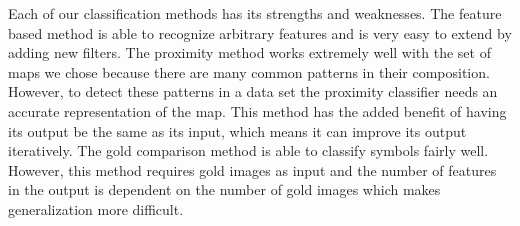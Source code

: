 
Each of our classification methods has its strengths and weaknesses.  The
feature based method is able to recognize arbitrary features and is very easy
to extend by adding new filters.  The proximity method works extremely well
with the set of maps we chose because there are many common patterns in their
composition.  However, to detect these patterns in a data set the proximity
classifier needs an accurate representation of the map. This method has the
added benefit of having its output be the same as its input, which means it can
improve its output iteratively.  The gold comparison method is able to classify
symbols fairly well. However, this method requires gold images as input and the
number of features in the output is dependent on the number of gold images
which makes generalization more difficult.

